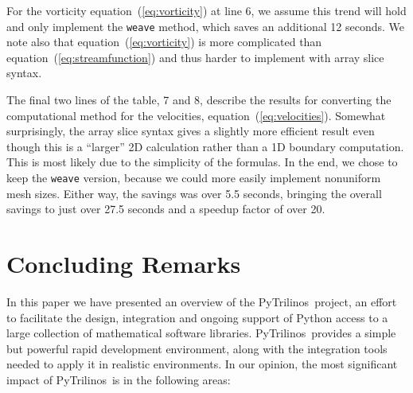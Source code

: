 \documentclass[acmtocl]{acmtrans2m}
\newcommand{\PyTrilinos}{{PyTrilinos}}
\begin{document}
For the vorticity equation~(\ref{eq:vorticity}) at line 6, we assume
this trend will hold and only implement the {\tt weave} method, which
saves an additional 12 seconds.  We note also that
equation~(\ref{eq:vorticity}) is more complicated than
equation~(\ref{eq:streamfunction}) and thus harder to implement with
array slice syntax.

The final two lines of the table, 7 and 8, describe the results for
converting the computational method for the velocities,
equation~(\ref{eq:velocities}).  Somewhat surprisingly, the array
slice syntax gives a slightly more efficient result even though this
is a ``larger'' 2D calculation rather than a 1D boundary computation.
This is most likely due to the simplicity of the formulas.  In the
end, we chose to keep the {\tt weave} version, because we could more
easily implement nonuniform mesh sizes.  Either way, the savings was
over 5.5 seconds, bringing the overall savings to just over 27.5
seconds and a speedup factor of over 20.

%
\section{Concluding Remarks}
\label{sec:concluding}

In this paper we have presented an overview of the \PyTrilinos\
project, an effort to facilitate the design, integration and ongoing
support of Python access to a large collection of mathematical
software libraries. \PyTrilinos\ provides a simple but powerful
rapid development environment, along with the integration tools
needed to apply it in realistic environments. In our opinion, the
most significant impact of \PyTrilinos\ is in the following areas:
\end{document}
